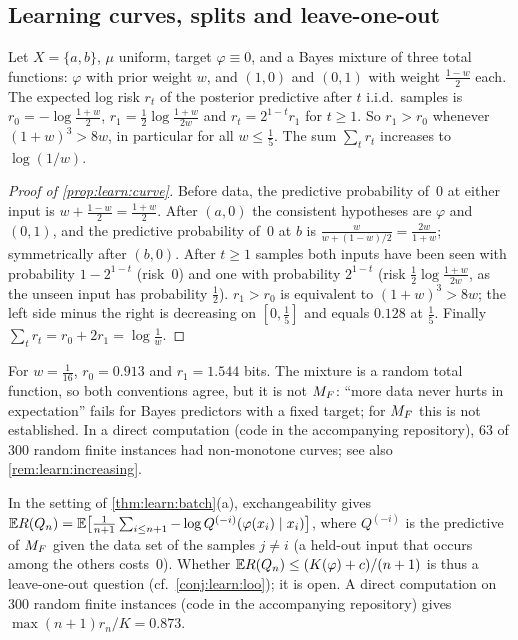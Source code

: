 \subsection{Learning curves, splits and leave-one-out}\label{app:learn:splits}

\begin{proposition}\label{prop:learn:curve}
Let $X=\{a,b\}$, $\mu$ uniform, target $\varphi\equiv0$, and a Bayes mixture of three total functions: $\varphi$ with prior weight $w$, and $(1,0)$ and $(0,1)$ with weight $\frac{1-w}2$ each. The expected log risk $r_t$ of the posterior predictive after $t$ i.i.d.\ samples is $r_0=-\log\frac{1+w}2$, $r_1=\frac12\log\frac{1+w}{2w}$ and $r_t=2^{1-t}r_1$ for $t\ge1$. So $r_1>r_0$ whenever $(1+w)^3>8w$, in particular for all $w\le\frac15$. The sum $\sum_tr_t$ increases to $\log(1/w)$.
\end{proposition}

\begin{proof}[Proof of \cref{prop:learn:curve}]
Before data, the predictive probability of~$0$ at either input is $w+\frac{1-w}2=\frac{1+w}2$. After $(a,0)$ the consistent hypotheses are $\varphi$ and $(0,1)$, and the predictive probability of~$0$ at $b$ is $\frac{w}{w+(1-w)/2}=\frac{2w}{1+w}$; symmetrically after $(b,0)$. After $t\ge1$ samples both inputs have been seen with probability $1-2^{1-t}$ (risk~$0$) and one with probability $2^{1-t}$ (risk $\frac12\log\frac{1+w}{2w}$, as the unseen input has probability $\frac12$). $r_1>r_0$ is equivalent to $(1+w)^3>8w$; the left side minus the right is decreasing on $[0,\frac15]$ and equals $0.128$ at $\frac15$. Finally $\sum_tr_t=r_0+2r_1=\log\frac1w$.
\end{proof}

For $w=\frac1{16}$, $r_0=0.913$ and $r_1=1.544$ bits. The mixture is a random total function, so both conventions agree, but it is not $M_{F}$: ``more data never hurts in expectation'' fails for Bayes predictors with a fixed target; for $M_{F}$ this is not established. In a direct computation (code in the accompanying repository), $63$ of $300$ random finite instances had non-monotone curves; see also \cref{rem:learn:increasing}.

\begin{remark}\label{rem:learn:lastiterate}
In the setting of \cref{thm:learn:batch}(a), exchangeability gives $\mathbb{E} R(Q_n)=\mathbb{E}\big[\frac1{n+1}\sum_{i\le n+1}-\log Q^{(-i)}(\varphi(x_i)\mid x_i)\big]$, where $Q^{(-i)}$ is the predictive of $M_{F}$ given the data set of the samples $j\ne i$ (a held-out input that occurs among the others costs~$0$). Whether $\mathbb{E} R(Q_n)\le(K(\varphi)+c)/(n+1)$ is thus a leave-one-out question (cf.\ \cref{conj:learn:loo}); it is open. A direct computation on $300$ random finite instances (code in the accompanying repository) gives $\max(n+1)r_n/K=0.873$.
\end{remark}

